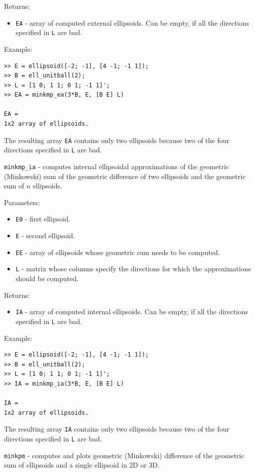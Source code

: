 \documentclass{report}
\begin{document}
Returns:
\begin{itemize}
\item {\tt EA} - array of computed external ellipsoids. Can be empty, if
all the directions specified in {\tt L} are bad.
\end{itemize}

Example:
{\tt \begin{verbatim}
>> E = ellipsoid([-2; -1], [4 -1; -1 1]);
>> B = ell_unitball(2);
>> L = [1 0; 1 1; 0 1; -1 1]';
>> EA = minkmp_ea(3*B, E, [B E] L)

EA =
1x2 array of ellipsoids.
\end{verbatim} }
The resulting array {\tt EA} contains only two ellipsoids because two
of the four directions specified in {\tt L} are bad.

\newpage

{\Large {\tt minkmp\_ia}} - computes internal ellipsoidal approximations
of the geometric (Minkowski) sum of the geometric difference of two ellipsoids
and the geometric sum of $n$ ellipsoids.

Parameters:
\begin{itemize}
\item {\tt E0} - first ellipsoid.
\item {\tt E} - second ellipsoid.
\item {\tt EE} - array of ellipsoids whose geometric sum needs to be computed.
\item {\tt L} - matrix whose columns specify the directions for which
the approximations should be computed.
\end{itemize}

Returns:
\begin{itemize}
\item {\tt IA} - array of computed internal ellipsoids. Can be empty, if
all the directions specified in {\tt L} are bad.
\end{itemize}

Example:
{\tt \begin{verbatim}
>> E = ellipsoid([-2; -1], [4 -1; -1 1]);
>> B = ell_unitball(2);
>> L = [1 0; 1 1; 0 1; -1 1]';
>> IA = minkmp_ia(3*B, E, [B E] L)

IA =
1x2 array of ellipsoids.
\end{verbatim} }
The resulting array {\tt IA} contains only two ellipsoids because two
of the four directions specified in {\tt L} are bad.

\newpage

{\Large {\tt minkpm}} - computes and plots geometric (Minkowski) difference of
the geometric sum of ellipsoids and a single ellipsoid in 2D or 3D.
\end{document}
